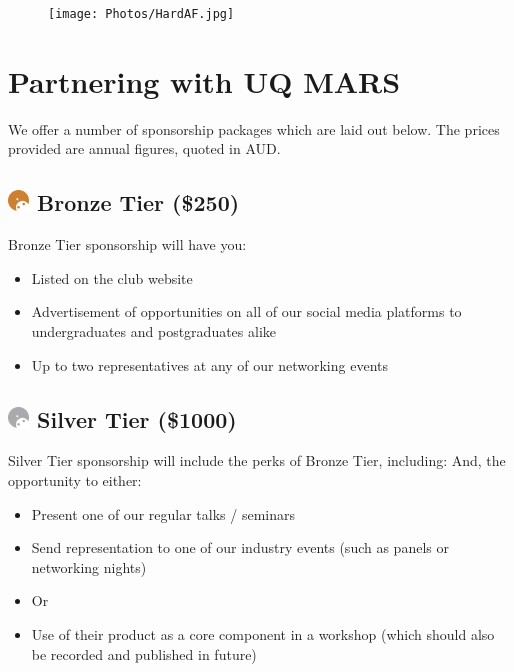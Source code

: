 \documentclass[a4paper,12pt]{report}
\begin{document}
\begin{figure}[H]
    \centering
    \texttt{[image: Photos/HardAF.jpg]}
\end{figure}

\newpage

\section*{Partnering with UQ MARS}
\large
We offer a number of sponsorship packages which are laid out below. The prices provided are annual figures, quoted in AUD.
\normalsize

\subsection*{
    \includegraphics[width=1em]{../assets/Sponsor Icons/Bronze.png}
    \textcolor{sponsor_bronze}{Bronze Tier (\$250)}
}
Bronze Tier sponsorship will have you:
\begin{itemize}
    \item Listed on the club website
    \item Advertisement of opportunities on all of our social media platforms to undergraduates and postgraduates alike
    \item Up to two representatives at any of our networking events
\end{itemize}

\subsection*{
    \includegraphics[width=1em]{../assets/Sponsor Icons/Silver.png}
    \textcolor{sponsor_silver}{Silver Tier (\$1000)}
}
Silver Tier sponsorship will include the perks of Bronze Tier, including:
And, the opportunity to either:
\begin{itemize}
    \item Present one of our regular talks / seminars
    \item Send representation to one of our industry events (such as panels or networking nights)
    \item Or
    \item Use of their product as a core component in a workshop (which should also be recorded and published in future)
\end{itemize}
\end{document}
